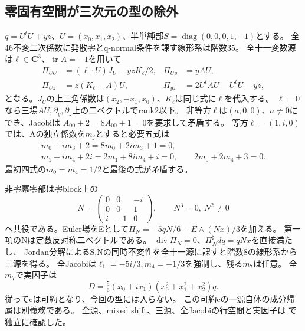 \documentclass[a4paper,11pt]{ltjsarticle}
\theoremstyle{definition}
\newcommand{\CC}{\mathbf C}
\begin{document}
\subsection{零固有空間が三次元の型の除外}
$q=U^tU+yz$、$U=(x_0,x_1,x_2)$、半単純部$S=\operatorname{diag}(0,0,0,1,-1)$とする。
全46不変二次係数に発散零とq-normal条件を課す線形系は階数35。
全十一変数源は$\ell\in\CC^3$、$\operatorname{tr}A=-1$を用いて
\[
 \begin{aligned}
 \Pi_{UU}&=(\ell\cdot U)J_U-yzK_\ell/2,&\Pi_{Uy}&=yAU,\\
 \Pi_{Uz}&=z(K_\ell-A)U,&\Pi_{yz}&=2U^tAU-U^tU-yz,
 \end{aligned}
\]
となる。$J_U$の上三角係数は$(x_2,-x_1,x_0)$、$K_\ell$は同じ式に$\ell$を代入する。
$\ell=0$なら三場$AU,\partial_y,\partial_z$上の二ベクトルでrank2以下。
非等方$\ell$は$(a,0,0)$、$a\ne0$にでき、Jacobiは
$A_{00}+2=8A_{00}+1=0$を要求して矛盾する。
等方$\ell=(1,i,0)$では、Aの独立係数を$m_j$とすると必要五式は
\[
 \begin{gathered}
 m_0+im_3+2=8m_0+2im_3+1=0,\\
 m_1+im_4+2i=2m_1+8im_4+i=0,\qquad2m_0+2m_4+3=0.
 \end{gathered}
\]
最初四式の$m_0=m_4=1/2$と最後の式が矛盾する。

非零冪零部は零block上の
\[
 N=\begin{pmatrix}0&0&-i\\0&0&1\\i&-1&0\end{pmatrix},\qquad N^3=0,\ N^2\ne0
\]
へ共役である。Euler場をEとして$\Pi_N=-5qN/6-E\wedge(Nx)/3$を加える。
第一項のNは定数反対称二ベクトルである。
$\operatorname{div}\Pi_N=0$、$\Pi_N^\sharp dq=qNx$を直接満たし、
Jordan分解によるS,Nの同時不変性を全十一源に課すと階数8の線形系から三源を得る。
全Jacobiは$\ell_1=-5i/3,m_4=-1/3$を強制し、残る$m_7$は任意。
全$m_7$で実因子は
\[
 D=\tfrac56(x_0+ix_1)(x_0^2+x_1^2+x_2^2)q.
\]
従ってcは可約となり、今回の型には入らない。
この可約cの一源自体の成分帰属は別義務である。
全源、mixed shift、三源、全Jacobiの行空間と実因子は
で独立に確認した。
\end{document}
